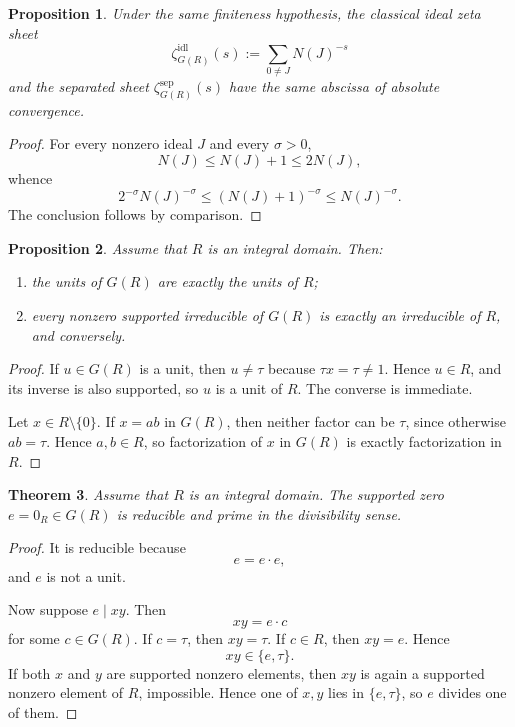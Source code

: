 \documentclass[11pt]{amsart}
\numberwithin{equation}{section}
\newtheorem{theorem}{Theorem}[section]
\newtheorem{proposition}[theorem]{Proposition}
\theoremstyle{definition}
\begin{document}
\begin{proposition}\label{prop:same-abscissa}
Under the same finiteness hypothesis, the classical ideal zeta sheet
\[
\zeta^{\mathrm{idl}}_{G(R)}(s):=\sum_{0\neq J}N(J)^{-s}
\]
and the separated sheet $\zeta^{\mathrm{sep}}_{G(R)}(s)$ have the same abscissa of absolute convergence.
\end{proposition}

\begin{proof}
For every nonzero ideal $J$ and every $\sigma>0$,
\[
N(J)\le N(J)+1\le 2N(J),
\]
whence
\[
2^{-\sigma}N(J)^{-\sigma}\le (N(J)+1)^{-\sigma}\le N(J)^{-\sigma}.
\]
The conclusion follows by comparison. 
\end{proof}

\begin{proposition}\label{prop:units-irreducibles}
Assume that $R$ is an integral domain. Then:
\begin{enumerate}[label=(\arabic*)]
    \item the units of $G(R)$ are exactly the units of $R$;
    \item every nonzero supported irreducible of $G(R)$ is exactly an irreducible of $R$, and conversely.
\end{enumerate}
\end{proposition}

\begin{proof}
If $u\in G(R)$ is a unit, then $u\neq \tau$ because $\tau x=\tau\neq1$. Hence $u\in R$, and its inverse is also supported, so $u$ is a unit of $R$. The converse is immediate.

Let $x\in R\setminus\{0\}$. If $x=ab$ in $G(R)$, then neither factor can be $\tau$, since otherwise $ab=\tau$. Hence $a,b\in R$, so factorization of $x$ in $G(R)$ is exactly factorization in $R$. 
\end{proof}

\begin{theorem}\label{thm:supported-zero-prime-reducible}
Assume that $R$ is an integral domain. The supported zero $e=0_R\in G(R)$ is reducible and prime in the divisibility sense.
\end{theorem}

\begin{proof}
It is reducible because
\[
e=e\cdot e,
\]
and $e$ is not a unit.

Now suppose $e\mid xy$. Then
\[
xy=e\cdot c
\]
for some $c\in G(R)$. If $c=\tau$, then $xy=\tau$. If $c\in R$, then $xy=e$. Hence
\[
xy\in\{e,\tau\}.
\]
If both $x$ and $y$ are supported nonzero elements, then $xy$ is again a supported nonzero element of $R$, impossible. Hence one of $x,y$ lies in $\{e,\tau\}$, so $e$ divides one of them. 
\end{proof}
\end{document}

